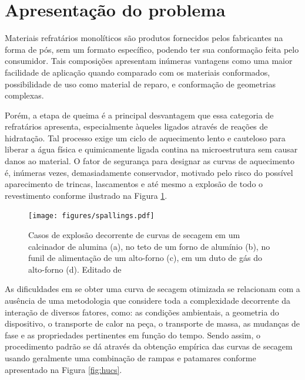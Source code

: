 \section{Apresentação do problema}
Materiais refratários monolíticos são produtos fornecidos pelos fabricantes na
forma de pós, sem um formato específico, podendo ter sua conformação feita pelo
consumidor. Tais composições apresentam inúmeras vantagens como uma maior
facilidade de aplicação quando comparado com os materiais conformados,
possibilidade de uso como material de reparo, e conformação de geometrias
complexas.

Porém, a etapa de queima é a principal desvantagem que essa categoria de
refratários apresenta, especialmente àqueles ligados através de reações de
hidratação. Tal processo exige um ciclo de aquecimento lento e cauteloso para
liberar a água física e quimicamente ligada contina na microestrutura sem causar
danos ao material. O fator de segurança para designar as curvas de aquecimento
é, inúmeras vezes, demasiadamente conservador, motivado pelo risco do possível
aparecimento de trincas, lascamentos e até mesmo a explosão de todo o
revestimento conforme ilustrado na Figura \ref{fig:spalls}.
    
    \begin{figure}[!ht]
        \centering
        \texttt{[image: figures/spallings.pdf]}
        \caption{Casos de explosão decorrente de curvas de secagem em um
          calcinador de alumina (a), no teto de um forno de alumínio (b), no
          funil de alimentação de um alto-forno (c), em um duto de gás do
          alto-forno (d). Editado de \cite{irish}}
        \label{fig:spalls}
   \end{figure}

   As dificuldades em se obter uma curva de secagem otimizada se relacionam com
   a ausência de uma metodologia que considere toda a complexidade decorrente da
   interação de diversos fatores, como: as condições ambientais, a geometria do
   dispositivo, o transporte de calor na peça, o transporte de massa, as
   mudanças de fase e as propriedades pertinentes em função do tempo. Sendo
   assim, o procedimento padrão se dá através da obtenção empírica das curvas de
   secagem usando geralmente uma combinação de rampas e patamares conforme
   apresentado na Figura \ref{fig:hucs}.
      
